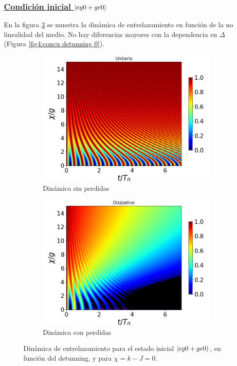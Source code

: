 \subsubsection{\underline{Condición inicial $\ket{eg0+ge0}$}}
En la figura \ref{fig4:concu x 0} se muestra la dinámica de entrelazamiento en función de la no linealidad del medio. No hay diferencias mayores con la dependencia en $\Delta$ (Figura \ref{fig4:concu detunning 0}).
\begin{figure}[h!]
    \centering
    \begin{subfigure}{0.49\textwidth}
        \includegraphics[width=\textwidth]{figuras/ch4/concu/chi/eg0+ge0 d=0.0g k=0.0g J=0.0g gamma=0.25g concu chi uni.png}
        \caption{Dinámica sin perdidas}
        \label{fig4:concu x 0 uni}
    \end{subfigure}
    \hfill
    \begin{subfigure}{0.49\textwidth}
        \includegraphics[width=\textwidth]{figuras/ch4/concu/chi/eg0+ge0 d=0.0g k=0.0g J=0.0g gamma=0.25g concu chi dis.png}
        \caption{Dinámica con perdidas}
        \label{fig4:concu x 0 dis}
    \end{subfigure}
    \caption{Dinámica de entrelazamiento para el estado inicial $\ket{eg0+ge0}$, en función del detunning, y para $\chi=k-J=0$.}
    \label{fig4:concu x 0}
\end{figure}

